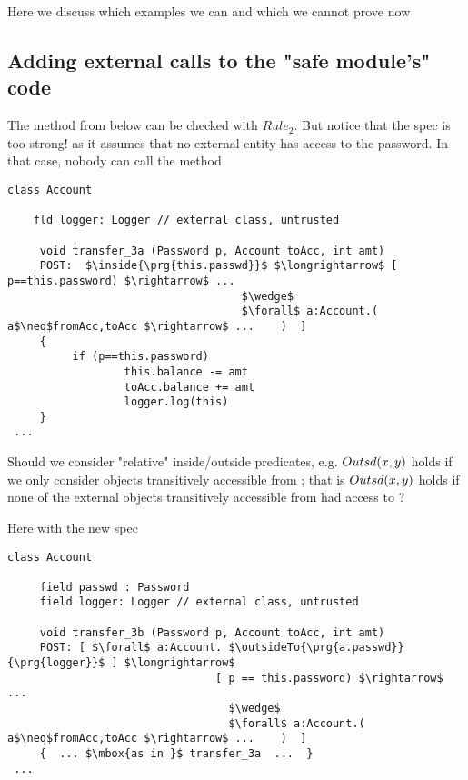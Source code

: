 Here we discuss which examples we can and which we cannot prove now

\subsection{Adding external calls to the "safe module's" code}

The method from below can be checked with $Rule_2$. \SP But notice that the spec is too strong! as it assumes that no external entity has access to the password. In that case, nobody can call the method 

\begin{lstlisting}[language=chainmail, mathescape=true, frame=lines]
class Account

    fld logger: Logger // external class, untrusted

     void transfer_3a (Password p, Account toAcc, int amt) 
     POST:  $\inside{\prg{this.passwd}}$ $\longrightarrow$ [ p==this.password) $\rightarrow$ ...
                                    $\wedge$
                                    $\forall$ a:Account.( a$\neq$fromAcc,toAcc $\rightarrow$ ...    )  ]
     {
          if (p==this.password) 
                  this.balance -= amt
                  toAcc.balance += amt
                  logger.log(this)
     }
 ...
\end{lstlisting}

\SP Should we consider "relative" inside/outside predicates, e.g. $Outsd(x,y)$ holds if we only consider  objects transitively accessible from ; that is  $Outsd(x,y)$ holds if none of the external objects transitively accessible from  had access to ?

Here with the new spec

\begin{lstlisting}[language=chainmail, mathescape=true, frame=lines]
class Account

     field passwd : Password
     field logger: Logger // external class, untrusted

     void transfer_3b (Password p, Account toAcc, int amt) 
     POST: [ $\forall$ a:Account. $\outsideTo{\prg{a.passwd}}{\prg{logger}}$ ] $\longrightarrow$   
                                [ p == this.password) $\rightarrow$ ...
                                  $\wedge$
                                  $\forall$ a:Account.( a$\neq$fromAcc,toAcc $\rightarrow$ ...    )  ]
     {  ... $\mbox{as in }$ transfer_3a  ...  }
 ...
\end{lstlisting}





